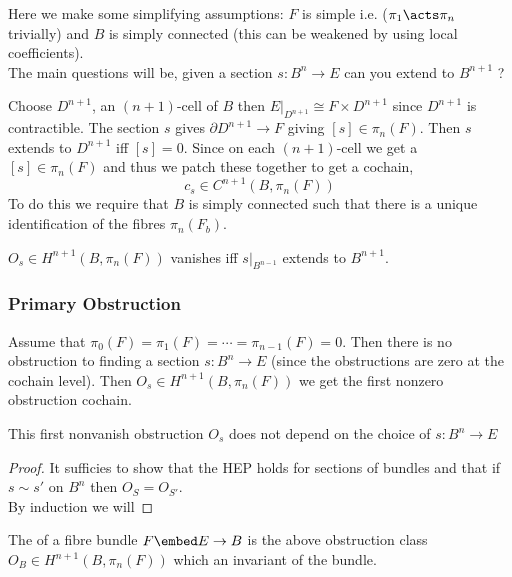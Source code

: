 \documentclass[12pt]{extarticle}
\begin{document}
\begin{rmk}
Here we make some simplifying assumptions: $F$ is simple i.e. ($\pi_1 \acts \pi_n$ trivially) and $B$ is simply connected (this can be weakened by using local coefficients).  
\bigskip\\
The main questions will be, given a section $s : B^n \to E$ can you extend to $B^{n+1}$ ?
\end{rmk}

Choose $D^{n+1}$, an $(n+1)$-cell of $B$ then $E|_{D^{n+1}} \cong F \times D^{n+1}$ since $D^{n+1}$ is contractible. The section $s$ gives $\partial D^{n+1} \to F$ giving $[s] \in \pi_n(F)$. Then $s$ extends to $D^{n+1}$ iff $[s] = 0$. Since on each $(n+1)$-cell we get a $[s] \in \pi_n(F)$ and thus we patch these together to get a cochain,
\[ c_s \in C^{n+1}(B, \pi_n(F)) \]
To do this we require that $B$ is simply connected such that there is a unique identification of the fibres $\pi_n(F_b)$. 

\begin{thm}
$O_s \in H^{n+1}(B, \pi_n(F))$ vanishes iff $s|_{B^{n-1}}$ extends to $B^{n+1}$. 
\end{thm}

\subsubsection{Primary Obstruction}

Assume that $\pi_0(F) = \pi_1(F) = \cdots = \pi_{n-1}(F) = 0$. Then there is no obstruction to finding a section $s : B^n \to E$ (since the obstructions are zero at the cochain level). Then $O_s \in H^{n+1}(B, \pi_n(F))$ we get the first nonzero obstruction cochain.

\begin{prop}
This first nonvanish obstruction $O_s$ does not depend on the choice of $s : B^n \to E$
\end{prop}

\begin{proof}
It sufficies to show that the HEP holds for sections of bundles and that if $s \sim s'$ on $B^n$ then $O_S = O_{S'}$. 
\bigskip\\
By induction we will 
\end{proof}

\begin{definition}
The  of a fibre bundle $F \embed E \to B$ is the above obstruction class $O_B \in H^{n+1}(B, \pi_n(F))$ which an invariant of the bundle. 
\end{definition}
\end{document}
